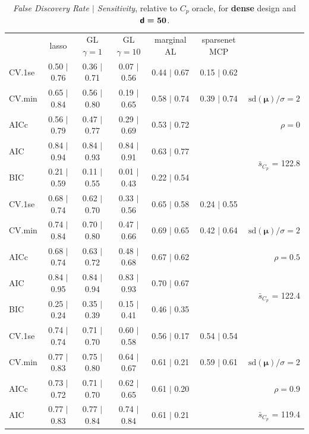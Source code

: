 \documentclass[12pt]{article}
\newcommand{\mr}[1]{\mathrm{#1}}
\newcommand{\bm}[1]{\mathbf{#1}}
\begin{document}
\begin{table}[p]\vspace{-.5cm}
\caption[l]{ {\it False Discovery Rate $\mid$ Sensitivity}, 
relative to $C_p$ oracle, for {\bf dense} design and $\boldsymbol{{\sf d}=50}$.}
\vspace{-.5cm}
\small{}
\begin{center}
\begin{tabular}{l*{5}{c}|r}
 & lasso & GL $\gamma=1$ & GL $\gamma=10$ & marginal AL & sparsenet MCP  & \\
 \cline{1-7}
CV.1se & 0.50 $\mid$ 0.76 & 0.36 $\mid$ 0.71 & 0.07 $\mid$ 0.56 & 0.44 $\mid$ 0.67 & 0.15 $\mid$ 0.62 &\\
CV.min & 0.65 $\mid$ 0.84 & 0.56 $\mid$ 0.80 & 0.19 $\mid$ 0.65 & 0.58 $\mid$ 0.74 & 0.39 $\mid$ 0.74 &  $\mr{sd}(\bm{\mu})/\sigma=2$ \\
AICc & 0.56 $\mid$ 0.79 & 0.47 $\mid$ 0.77 & 0.29 $\mid$ 0.69 & 0.53 $\mid$ 0.72 & & $\rho=0$ \\
AIC & 0.84 $\mid$ 0.94 & 0.84 $\mid$ 0.93 & 0.84 $\mid$ 0.91 & 0.63 $\mid$ 0.77 & & \multirow{2}{*}{$\bar{s}_{C_p}$ = 122.8} \\
BIC & 0.21 $\mid$ 0.59 & 0.11 $\mid$ 0.55 & 0.01 $\mid$ 0.43 & 0.22 $\mid$ 0.54 & & \\
 \hline 
CV.1se & 0.68 $\mid$ 0.74 & 0.62 $\mid$ 0.70 & 0.33 $\mid$ 0.56 & 0.65 $\mid$ 0.58 & 0.24 $\mid$ 0.55 &\\
CV.min & 0.74 $\mid$ 0.84 & 0.70 $\mid$ 0.80 & 0.47 $\mid$ 0.66 & 0.69 $\mid$ 0.65 & 0.42 $\mid$ 0.64 &  $\mr{sd}(\bm{\mu})/\sigma=2$ \\
AICc & 0.68 $\mid$ 0.74 & 0.63 $\mid$ 0.72 & 0.48 $\mid$ 0.68 & 0.67 $\mid$ 0.62 & & $\rho=0.5$ \\
AIC & 0.84 $\mid$ 0.95 & 0.84 $\mid$ 0.94 & 0.83 $\mid$ 0.93 & 0.70 $\mid$ 0.67 & & \multirow{2}{*}{$\bar{s}_{C_p}$ = 122.4} \\
BIC & 0.25 $\mid$ 0.24 & 0.35 $\mid$ 0.39 & 0.15 $\mid$ 0.41 & 0.46 $\mid$ 0.35 & & \\
 \hline 
CV.1se & 0.74 $\mid$ 0.74 & 0.71 $\mid$ 0.70 & 0.60 $\mid$ 0.58 & 0.56 $\mid$ 0.17 & 0.54 $\mid$ 0.54 &\\
CV.min & 0.77 $\mid$ 0.83 & 0.75 $\mid$ 0.80 & 0.64 $\mid$ 0.67 & 0.61 $\mid$ 0.21 & 0.59 $\mid$ 0.61 &  $\mr{sd}(\bm{\mu})/\sigma=2$ \\
AICc & 0.73 $\mid$ 0.72 & 0.71 $\mid$ 0.70 & 0.62 $\mid$ 0.65 & 0.61 $\mid$ 0.20 & & $\rho=0.9$ \\
AIC & 0.77 $\mid$ 0.83 & 0.77 $\mid$ 0.84 & 0.74 $\mid$ 0.84 & 0.61 $\mid$ 0.21 & & \multirow{2}{*}{$\bar{s}_{C_p}$ = 119.4} \\

\end{tabular}
\end{center}
\end{table}
\end{document}
